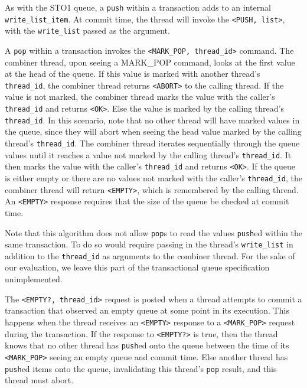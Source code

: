 As with the STO1 queue, a \texttt{push} within a transaction adds to an internal \texttt{write\_list\_item}. At commit time, the thread will invoke the \texttt{<PUSH, list>}, with the \texttt{write\_list} passed as the argument.

A \texttt{pop} within a transaction invokes the \texttt{<MARK\_POP, thread\_id>} command. The combiner thread, upon seeing a MARK\_POP command, looks at the first value at the head of the queue. If this value is marked with another thread’s \texttt{thread\_id}, the combiner thread returns \texttt{<ABORT>} to the calling thread. If the value is not marked, the combiner thread marks the value with the caller’s \texttt{thread\_id} and returns \texttt{<OK>}. Else the value is marked by the calling thread’s \texttt{thread\_id}. In this scenario, note that no other thread will have marked values in the queue, since they will abort when seeing the head value marked by the calling thread’s \texttt{thread\_id}. The combiner thread iterates sequentially through the queue values until it reaches a value not marked by the calling thread’s \texttt{thread\_id}. It then marks the value with the caller’s \texttt{thread\_id} and returns \texttt{<OK>}. If the queue is either empty or there are no values not marked with the caller’s \texttt{thread\_id}, the combiner thread will return \texttt{<EMPTY>}, which is remembered by the calling thread. An \texttt{<EMPTY>} response requires that the size of the queue be checked at commit time.

Note that this algorithm does not allow \texttt{pop}s to read the values \texttt{push}ed within the same transaction. To do so would require passing in the thread’s \texttt{write\_list} in addition to the \texttt{thread\_id} as arguments to the combiner thread. For the sake of our evaluation, we leave this part of the transactional queue specification unimplemented.

The \texttt{<EMPTY?, thread\_id>} request is posted when a thread attempts to commit a transaction that observed an empty queue at some point in its execution. This happens when the thread receives an \texttt{<EMPTY>} response to a \texttt{<MARK\_POP>} request during the transaction. If the response to \texttt{<EMPTY?>} is true, then the thread knows that no other thread has \texttt{push}ed onto the queue between the time of its \texttt{<MARK\_POP>} seeing an empty queue and commit time. Else another thread has \texttt{push}ed items onto the queue, invalidating this thread’s \texttt{pop} result, and this thread must abort.

